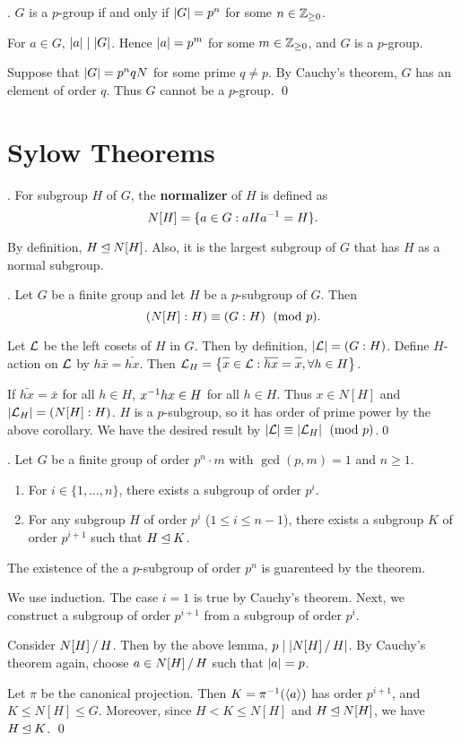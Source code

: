 \cor. \(G\) is a \(p\)-group if and only if \(\left| G \right| = p^n\) for some \(n \in \mathbb{Z}_{\geq 0}\).

\pf \note{\mimpd} For \(a \in G\), \(\left| a \right| \mid \left| G \right|\). Hence \(\left| a \right| = p^m\) for some \(m \in \mathbb{Z}_{\geq 0}\), and \(G\) is a \(p\)-group.

\note{\mimp} Suppose that \(\left| G \right| = p^n q N\) for some prime \(q \neq p\). By Cauchy's theorem, \(G\) has an element of order \(q\). Thus \(G\) cannot be a \(p\)-group. \qed

\section*{Sylow Theorems}

.  For subgroup \(H\) of \(G\), the \textbf{normalizer} of \(H\) is defined as
\[
    N[H] = \{a \in G : aHa^{-1} = H\}.
\]

By definition, \(H \unlhd N[H]\). Also, it is the largest subgroup of \(G\) that has \(H\) as a normal subgroup.

\lemma. Let \(G\) be a finite group and let \(H\) be a \(p\)-subgroup of \(G\). Then
\[
    \left(N[H] : H\right) \equiv \left(G : H\right) \pmod p.
\]

\pf Let \(\mathcal{L}\) be the left cosets of \(H\) in \(G\). Then by definition, \(\left| \mathcal{L} \right| = \left(G : H\right)\). Define \(H\)-action on \(\mathcal{L}\) by \(h\bar{x} = \bar{hx}\). Then \(\mc{L}_H = \left\{\bar{x} \in \mc{L} : \bar{hx} = \bar{x}, \forall h \in H\right\}\).

If \(\bar{hx} = \bar{x}\) for all \(h \in H\), \(x^{-1} h x \in H\) for all \(h \in H\). Thus \(x \in N[H]\) and \(\left| \mathcal{L}_H \right| = \left(N[H] : H\right)\). \(H\) is a \(p\)-subgroup, so it has order of prime power by the above corollary. We have the desired result by \(\left| \mathcal{L} \right| \equiv \left| \mathcal{L}_H \right| \pmod p\).\qed

\bigskip

\thm.  Let \(G\) be a finite group of order \(p^n \cdot m\) with \(\gcd(p, m) = 1\) and \(n \geq 1\).
\begin{enumerate}
    \item For \(i \in \{1, \dots, n\}\), there exists a subgroup of order \(p^i\).
    \item For any subgroup \(H\) of order \(p^i\) (\(1 \leq i \leq n - 1\)), there exists a subgroup \(K\) of order \(p^{i+1}\) such that \(H \unlhd K\).
\end{enumerate}

The existence of the a \(p\)-subgroup of order \(p^n\) is guarenteed by the theorem.

\pf We use induction. The case \(i = 1\) is true by Cauchy's theorem. Next, we construct a subgroup of order \(p^{i+1}\) from a subgroup of order \(p^i\).

Consider \(N[H] \operatorname{/} H\). Then by the above lemma, \(p \mid \left| N[H] \operatorname{/} H \right|\). By Cauchy's theorem again, choose \(a \in N[H] \operatorname{/} H\) such that \(\left| a \right| = p\).

Let \(\pi\) be the canonical projection. Then \(K = \pi^{-1}(\left\langle a \right\rangle)\) has order \(p^{i+1}\), and \(K \leq N[H] \leq G\). Moreover, since \(H < K \leq N[H]\) and \(H \unlhd N[H]\), we have \(H \unlhd K\). \qed
